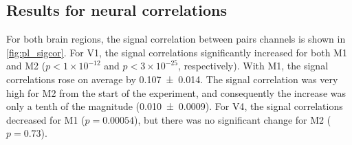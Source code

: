 \subsection{Results for neural correlations}


For both brain regions, the signal correlation between pairs channels is shown in \autoref{fig:pl_sigcor}.
For \ac{V1}, the signal correlations significantly increased for both \ac{M1} and \ac{M2} ($p < 1 \times 10^{-12}$ and $p < 3 \times 10^{-25}$, respectively).
With \ac{M1}, the signal correlations rose on average by \num{0.107\pm0.014}.
The signal correlation was very high for \ac{M2} from the start of the experiment, and consequently the increase was only a tenth of the magnitude (\num{0.010\pm0.0009}).
For \ac{V4}, the signal correlations decreased for \ac{M1} ($p=0.00054$), but there was no significant change for \ac{M2} ($p=0.73$).

